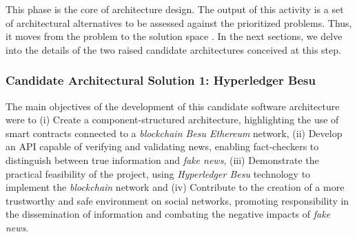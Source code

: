 This phase is the core of architecture design. The output of this activity is a set of architectural alternatives to be assessed against the prioritized problems. Thus, it moves from the problem to the solution space \cite{HOFMEISTER2007,TeixeiraL2020}. 
In the next sections, we delve into the details of the two raised candidate architectures conceived at this step.
\\ %

\subsubsection{Candidate Architectural Solution 1: Hyperledger Besu}

The main objectives of the development of this candidate software architecture were to (i) Create a component-structured architecture, highlighting the use of smart contracts connected to a \textit{blockchain Besu Ethereum} network, (ii) Develop an API capable of verifying and validating news, enabling fact-checkers to distinguish between true information and \textit{fake news}, (iii) Demonstrate the practical feasibility of the project, using \textit{Hyperledger Besu} technology to implement the \textit{blockchain} network and (iv) Contribute to the creation of a more trustworthy and safe environment on social networks, promoting responsibility in the dissemination of information and combating the negative impacts of \textit{fake news}.

